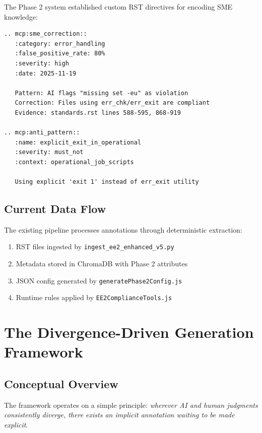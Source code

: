 \documentclass[11pt,a4paper]{article}
\begin{document}
The Phase 2 system established custom RST directives for encoding SME knowledge:

\begin{lstlisting}[style=rst, caption={Phase 2 RST Directive Examples}]
.. mcp:sme_correction::
   :category: error_handling
   :false_positive_rate: 80%
   :severity: high
   :date: 2025-11-19
   
   Pattern: AI flags "missing set -eu" as violation
   Correction: Files using err_chk/err_exit are compliant
   Evidence: standards.rst lines 588-595, 868-919
   
.. mcp:anti_pattern::
   :name: explicit_exit_in_operational
   :severity: must_not
   :context: operational_job_scripts
   
   Using explicit 'exit 1' instead of err_exit utility
\end{lstlisting}

\subsection{Current Data Flow}

The existing pipeline processes annotations through deterministic extraction:

\begin{enumerate}
    \item RST files ingested by \texttt{ingest\_ee2\_enhanced\_v5.py}
    \item Metadata stored in ChromaDB with Phase 2 attributes
    \item JSON config generated by \texttt{generatePhase2Config.js}
    \item Runtime rules applied by \texttt{EE2ComplianceTools.js}
\end{enumerate}

\section{The Divergence-Driven Generation Framework}

\subsection{Conceptual Overview}

The framework operates on a simple principle: \textit{wherever AI and human judgments consistently diverge, there exists an implicit annotation waiting to be made explicit}.
\end{document}
